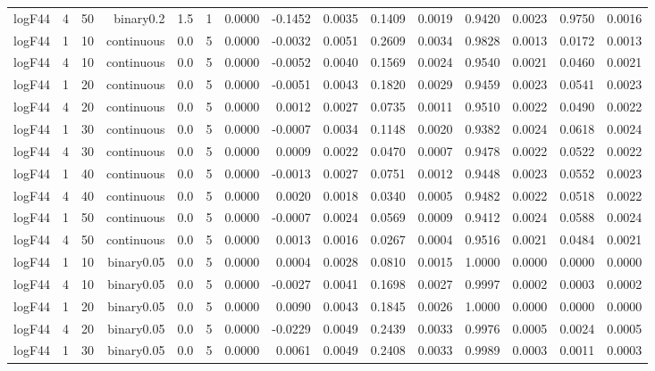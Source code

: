 \begin{longtable}{rrrrrrrrrrrrrrr}
  logF44 & 4 & 50 & binary0.2 & 1.5 & 1 & 0.0000 & -0.1452 & 0.0035 & 0.1409 & 0.0019 & 0.9420 & 0.0023 & 0.9750 & 0.0016 \\ 
  logF44 & 1 & 10 & continuous & 0.0 & 5 & 0.0000 & -0.0032 & 0.0051 & 0.2609 & 0.0034 & 0.9828 & 0.0013 & 0.0172 & 0.0013 \\ 
  logF44 & 4 & 10 & continuous & 0.0 & 5 & 0.0000 & -0.0052 & 0.0040 & 0.1569 & 0.0024 & 0.9540 & 0.0021 & 0.0460 & 0.0021 \\ 
  logF44 & 1 & 20 & continuous & 0.0 & 5 & 0.0000 & -0.0051 & 0.0043 & 0.1820 & 0.0029 & 0.9459 & 0.0023 & 0.0541 & 0.0023 \\ 
  logF44 & 4 & 20 & continuous & 0.0 & 5 & 0.0000 & 0.0012 & 0.0027 & 0.0735 & 0.0011 & 0.9510 & 0.0022 & 0.0490 & 0.0022 \\ 
  logF44 & 1 & 30 & continuous & 0.0 & 5 & 0.0000 & -0.0007 & 0.0034 & 0.1148 & 0.0020 & 0.9382 & 0.0024 & 0.0618 & 0.0024 \\ 
  logF44 & 4 & 30 & continuous & 0.0 & 5 & 0.0000 & 0.0009 & 0.0022 & 0.0470 & 0.0007 & 0.9478 & 0.0022 & 0.0522 & 0.0022 \\ 
  logF44 & 1 & 40 & continuous & 0.0 & 5 & 0.0000 & -0.0013 & 0.0027 & 0.0751 & 0.0012 & 0.9448 & 0.0023 & 0.0552 & 0.0023 \\ 
  logF44 & 4 & 40 & continuous & 0.0 & 5 & 0.0000 & 0.0020 & 0.0018 & 0.0340 & 0.0005 & 0.9482 & 0.0022 & 0.0518 & 0.0022 \\ 
  logF44 & 1 & 50 & continuous & 0.0 & 5 & 0.0000 & -0.0007 & 0.0024 & 0.0569 & 0.0009 & 0.9412 & 0.0024 & 0.0588 & 0.0024 \\ 
  logF44 & 4 & 50 & continuous & 0.0 & 5 & 0.0000 & 0.0013 & 0.0016 & 0.0267 & 0.0004 & 0.9516 & 0.0021 & 0.0484 & 0.0021 \\ 
  logF44 & 1 & 10 & binary0.05 & 0.0 & 5 & 0.0000 & 0.0004 & 0.0028 & 0.0810 & 0.0015 & 1.0000 & 0.0000 & 0.0000 & 0.0000 \\ 
  logF44 & 4 & 10 & binary0.05 & 0.0 & 5 & 0.0000 & -0.0027 & 0.0041 & 0.1698 & 0.0027 & 0.9997 & 0.0002 & 0.0003 & 0.0002 \\ 
  logF44 & 1 & 20 & binary0.05 & 0.0 & 5 & 0.0000 & 0.0090 & 0.0043 & 0.1845 & 0.0026 & 1.0000 & 0.0000 & 0.0000 & 0.0000 \\ 
  logF44 & 4 & 20 & binary0.05 & 0.0 & 5 & 0.0000 & -0.0229 & 0.0049 & 0.2439 & 0.0033 & 0.9976 & 0.0005 & 0.0024 & 0.0005 \\ 
  logF44 & 1 & 30 & binary0.05 & 0.0 & 5 & 0.0000 & 0.0061 & 0.0049 & 0.2408 & 0.0033 & 0.9989 & 0.0003 & 0.0011 & 0.0003 \\ 

\end{longtable}
